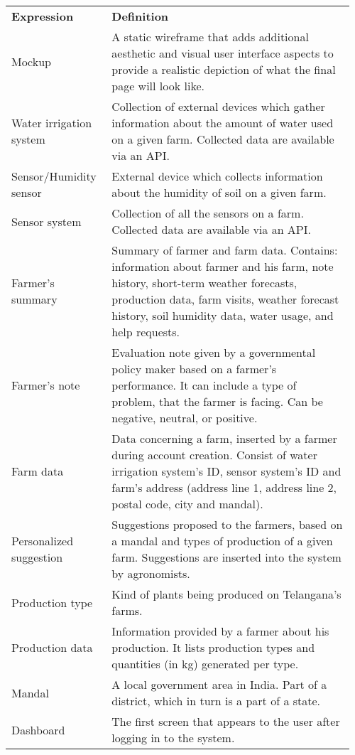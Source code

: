 \begin{center}
    \begin{longtable}{@{}p{0.28\linewidth} p{0.68\linewidth}@{}}
		\toprule
		\textbf{Expression}     & \textbf{Definition}\\
		Mockup					& A static wireframe that adds additional aesthetic and visual user interface aspects to provide a realistic depiction of what the final page will look like.\\
		Water irrigation system & Collection of external devices which gather information about the amount of water used on a given farm. Collected data are available via an API. \\
        Sensor/Humidity sensor 	& External device which collects information about the humidity of soil on a given farm.\\
        Sensor system           & Collection of all the sensors on a farm. Collected data are available via an API.\\
        Farmer's summary        & Summary of farmer and farm data. Contains: information about farmer and his farm, note history, short-term weather forecasts, production data, farm visits, weather forecast history, soil humidity data, water usage, and help requests.\\
        Farmer's note           & Evaluation note given by a governmental policy maker based on a farmer's performance. It can include a type of problem, that the farmer is facing. Can be negative, neutral, or positive.\\
        Farm data               & Data concerning a farm, inserted by a farmer during account creation. Consist of water irrigation system's ID, sensor system's ID and farm's address (address line 1, address line 2, postal code, city and mandal).\\
        Personalized suggestion & Suggestions proposed to the farmers, based on a mandal and types of production of a given farm. Suggestions are inserted into the system by agronomists.\\
        Production type         & Kind of plants being produced on Telangana's farms.\\
        Production data         & Information provided by a farmer about his production. It lists production types and quantities (in kg) generated per type.\\
        Mandal                  & A local government area in India. Part of a district, which in turn is a part of a state.\\
        Dashboard               & The first screen that appears to the user after logging in to the system.\\

\end{longtable}
\end{center}
